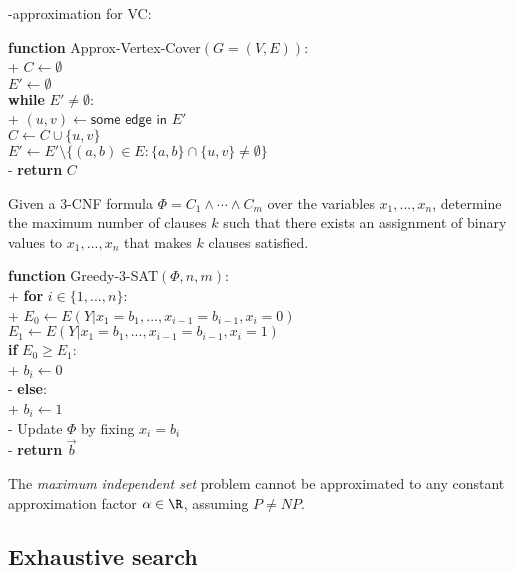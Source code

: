 \documentclass{article}
\begin{document}
-approximation for VC:
\begin{pseudo}
\textbf{function} \textsf{Approx-Vertex-Cover}$(G=(V,E))$:\\+
	$C\leftarrow \emptyset$\\
	$E'\leftarrow\emptyset$\\
	\textbf{while} $E'\not=\emptyset$:\\+
		$(u,v)\leftarrow\textsf{some edge in }E'$\\
		$C\leftarrow C\cup\{u,v\}$\\
		$E'\leftarrow E'\setminus\{(a,b)\in E : \{a,b\}\cap\{u,v\}\not=\emptyset\}$\\-
    \textbf{return} $C$
\end{pseudo}

\begin{definition}
	Given a 3-CNF formula $\Phi=C_1\wedge\cdots\wedge C_m$ over the variables
	$x_1, ..., x_n$, determine the maximum number of clauses $k$ such that there
	exists an assignment of binary values to $x_1, ..., x_n$ that makes $k$
	clauses satisfied.
\end{definition}

\begin{pseudo}
\textbf{function} \textsf{Greedy-3-SAT}$(\Phi, n, m)$:\\+
	\textbf{for} $i\in\{1,...,n\}$:\\+
		$E_0 \leftarrow E(Y|x_1=b_1, ...,x_{i-1}=b_{i-1},x_i=0)$\\
		$E_1 \leftarrow E(Y|x_1=b_1, ...,x_{i-1}=b_{i-1},x_i=1)$\\
		\textbf{if} $E_0\geq E_1$:\\+
			$b_i\leftarrow 0$\\-
        \textbf{else}:\\+
			$b_i\leftarrow 1$\\-
		Update $\Phi$ by fixing $x_i=b_i$\\-
    \textbf{return }$\vec b$
\end{pseudo}

\begin{theorem}
	The \emph{maximum independent set} problem cannot be approximated to
	any constant approximation factor $\alpha\in\R$, assuming $P\not= NP$.
\end{theorem}

\subsection{Exhaustive search}
\end{document}
